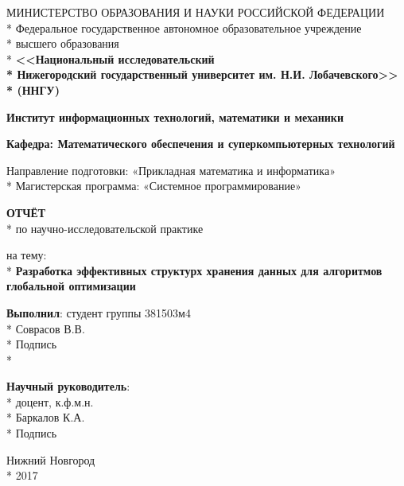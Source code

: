 \begin{titlepage}

\begin{center}
МИНИСТЕРСТВО ОБРАЗОВАНИЯ И НАУКИ РОССИЙСКОЙ ФЕДЕРАЦИИ \\*
Федеральное   государственное  автономное  образовательное  учреждение \\*
высшего образования \\*
\textbf{<<Национальный исследовательский \\*
Нижегородский государственный университет им. Н.И. Лобачевского>> \\*
(ННГУ)}
\end{center}

\vspace{12pt}

\begin{center}
\textbf{Институт информационных технологий, математики и механики}
\end{center}

\begin{center}
\textbf{Кафедра: Математического обеспечения и суперкомпьютерных технологий}
\end{center}

\vspace{25pt}
\begin{center}
Направление подготовки: «Прикладная математика и информатика» \\*
Магистерская программа: «Системное программирование»
\end{center}
\vspace{30pt}

\begin{center}
\fontsize{18pt}{0pt}\textbf{ОТЧЁТ} \\*
по научно-исследовательской практике
\end{center}
\begin{center}
на тему: \\*
\fontsize{16pt}{0pt}\textbf{Разработка эффективных структурх хранения данных для алгоритмов глобальной оптимизации}
\end{center}

\vspace{53pt}

\begin{flushright}
\textbf{Выполнил}: студент группы 381503м4 \\*
 Соврасов В.В. \\*
Подпись  \\*

\textbf{Научный руководитель}:  \\*
доцент, к.ф.м.н.  \\*
 Баркалов К.А. \\*
Подпись 
\end{flushright}

\vspace{\fill}

\begin{center}
Нижний Новгород \\*
2017
\end{center}

\end{titlepage}
